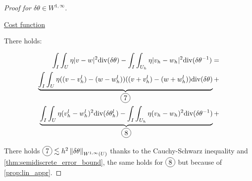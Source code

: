 \documentclass[english,a4paper,10pt,oneside]{scrbook}	%
\theoremstyle{break}
\newenvironment{mproof}[1][\proofname]{%
  \begin{proof}[#1]$ $\par\nobreak\ignorespaces
}{%
  \end{proof}
}
\renewcommand*{\proofname}{Proof}
\theoremstyle{remark}
\newcommand{\ds}{\displaystyle}
\newcommand{\norm}[1]{\left\lVert#1\right\rVert}
\newcommand{\te}{\theta}
\newcommand{\dive}{\text{div}}
\newcommand*\circled[1]{\tikz[baseline=(char.base)]{
            \node[shape=circle,draw,inner sep=2pt] (char) {#1};}}
\begin{document}
\begin{mproof}[Proof for $\delta \te \in W^{1,\infty}$]
%
%
%
%

\underline{Cost function}

There holds:

\begin{align*}
	\int_I \int_U \eta |v-w|^2 \dive(\delta \te) - \int_I \int_{U_h} \eta |v_h-w_h|^2\dive(\delta \te^{-1})=\\
	\underbrace{\int_I\int_U\eta((v-v_h^l)-(w-w_h^l))((v+v_h^l)-(w+w_h^l))\dive(\delta \te)}_{\circled{7}} +\\ \underbrace{\int_I\int_U\eta(v_h^l-w_h^l)^2\dive(\delta \te_h^l)-\int_I\int_{U_h}\eta (v_h-w_h)^2\dive(\delta \te^{-1})}_{\circled{8}}+\\
\end{align*}



There holds $\circled{7} \lesssim h^2\norm{\delta \te}_{W^{1,\infty}(U)}$ thanks to the Cauchy-Schwarz inequality and \cref{thm:semidiscrete_error_bound}, the same holds for $\circled{8}$ but because of \cref{prop:lin_appr}.
\end{mproof}
\end{document}
